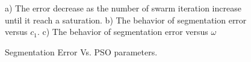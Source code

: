 \documentclass[preprint,10pt,5p,twocolumn]{elsarticle}
\begin{document}
 \begin{figure}
	\centering		
  
		
		
	
		
	 	\caption{Segmentation Error Vs. PSO parameters.}a) The error decrease as the number of swarm iteration increase until it reach a saturation.   b) The behavior of segmentation error versus $c_1$. c) The behavior of segmentation error versus  $\omega$
	 
 	
\end{figure} 
\end{document}
